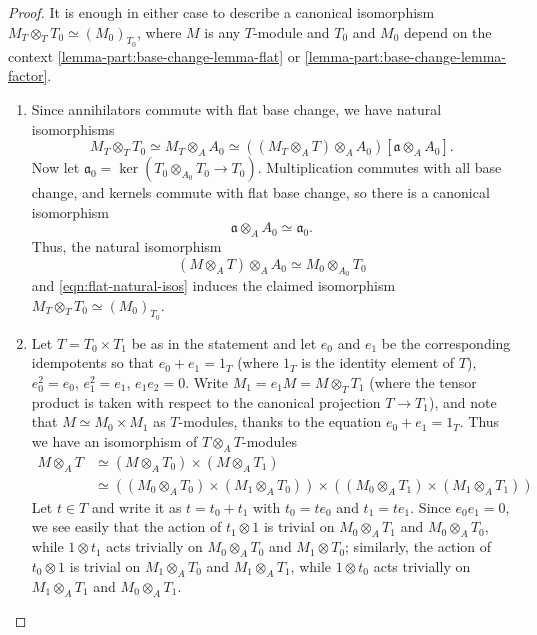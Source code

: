 \documentclass[10pt,a4paper]{amsart}
\def\ga{\mathfrak a}
\begin{document}
\begin{proof}
It is enough in either case to describe a canonical isomorphism $M_T\otimes_T T_0 \simeq (M_0)_{T_0}$, where $M$ is any $T$-module and $T_0$ and $M_0$ depend on the context \ref{lemma-part:base-change-lemma-flat} or \ref{lemma-part:base-change-lemma-factor}.
\begin{enumerate}[label=(\alph*)]
\item Since annihilators commute with flat { base} change, we have natural isomorphisms
\begin{equation}\label{eqn:flat-natural-isos}
M_T\otimes_T T_0 \simeq M_T\otimes_A A_0 \simeq \left((M_T\otimes_A T) \otimes_A A_0\right)[\ga \otimes_A A_0].
\end{equation}
Now let $\ga_0 = \ker(T_0\otimes_{A_0} T_0 \rightarrow T_0)$. Multiplication commutes with all base change, and kernels commute with flat base change, so there is a canonical isomorphism
\begin{equation*}
\ga \otimes_A A_0 \simeq \ga_0.
\end{equation*}
Thus, the natural isomorphism 
\begin{equation*}
(M\otimes_A T) \otimes_A A_0 \simeq M_0\otimes_{A_0} T_0
\end{equation*}
and \eqref{eqn:flat-natural-isos} induces the claimed isomorphism $M_T\otimes_T T_0 \simeq (M_0)_{T_0}$.
\item 
{ Let $T = T_0 \times T_1$ be as in the statement and let $e_0$ and $e_1$ be the corresponding idempotents so that $e_0+e_1=1_T$ (where $1_T$ is the identity element of $T$), $e_0^2=e_0$, $e_1^2=e_1$, $e_1e_2=0$. 
Write $M_1 = e_1M= M\otimes_T T_1$ (where the tensor product is taken with respect to the canonical projection $T\rightarrow T_1$), and note that $M \simeq M_0 \times M_1$ as $T$-modules, thanks to the equation $e_0+e_1=1_T$. Thus we have an isomorphism of $T\otimes_AT$-modules 
\begin{equation}\label{eqn:base-change-sum}
\begin{split} M\otimes_A T &\simeq ( M \otimes_A T_0)\times (M\otimes_A T_1)\\
&\simeq 
\left(( M_0 \otimes_A T_0)\times (M_1\otimes_A T_0)\right)\times \left((M_0\otimes_A T_1)\times (M_1\otimes_AT_1)\right)
\end{split}
\end{equation}
Let $t\in T$ and write it as $t=t_0+t_1$ with $t_0=te_0$ and $t_1=te_1$. 
Since $e_0e_1=0$, we see easily that the action of $t_1\otimes 1$ is trivial on $M_0\otimes_A T_1$ and $M_0\otimes_AT_0$, while $1\otimes t_1$ acts trivially on $M_0\otimes_AT_0$ and $M_1\otimes T_0$; similarly, the action of $t_0\otimes 1$ is trivial on $M_1\otimes_AT_0$ and $M_1\otimes_AT_1$, while $1\otimes t_0$ acts trivially on $M_1\otimes_AT_1$ and $M_0\otimes_AT_1$.   
}
\end{enumerate}
\end{proof}
\end{document}
